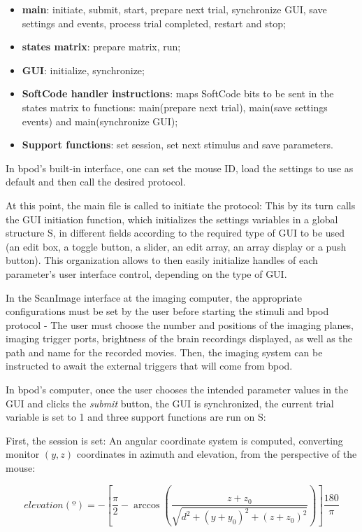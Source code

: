 \begin{itemize}
\item \textbf{main}: initiate, submit, start, prepare next trial, synchronize GUI, save settings and events, process trial completed, restart and stop;
\item \textbf{states matrix}: prepare matrix, run;
\item \textbf{GUI}: initialize, synchronize;
\item \textbf{SoftCode handler instructions}: maps SoftCode bits to be sent in the states matrix to functions: main(prepare next trial), main(save settings events) and main(synchronize GUI);
\item \textbf{Support functions}: set session, set next stimulus and save parameters.
\end{itemize}

In bpod's built-in interface, one can set the mouse ID, load the settings to use as default and then call the desired protocol. 

At this point, the main file is called to initiate the protocol: This by its turn calls the GUI initiation function, which initializes the settings variables in a global structure S, in different fields according to the required type of GUI to be used (an edit box, a toggle button, a slider, an edit array, an array display or a push button). This organization allows to then easily initialize handles of each parameter's user interface control, depending on the type of GUI.

In the ScanImage interface at the imaging computer, the appropriate configurations must be set by the user before starting the stimuli and bpod protocol - The user must choose the number and positions of the imaging planes, imaging trigger ports, brightness of the brain recordings displayed, as well as the path and name for the recorded movies. Then, the imaging system can be instructed to await the external triggers that will come from bpod.

In bpod's computer, once the user chooses the intended parameter values in the GUI and clicks the \textit{submit} button, the GUI is synchronized, the current trial variable is set to 1 and three support functions are run on S: 

First, the session is set: An angular coordinate system is computed, converting monitor $(y,z)$ coordinates in azimuth and elevation, from the perspective of the mouse:

\begin{equation}
elevation(º)= - \left[ \dfrac{\pi}{2} - \arccos \left( \dfrac{z+z_0}{\sqrt{d^2 + (y + y_0)^2 + (z+z_0)^2}} \right) \right] \dfrac{180}{\pi}
\end{equation}

